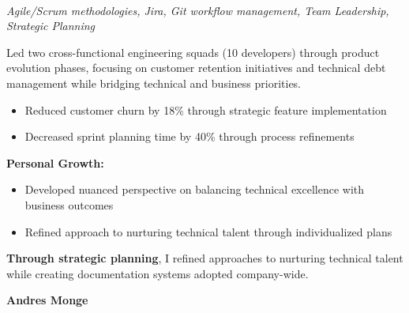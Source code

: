 \documentclass[a4paper,10pt]{article}
\newcommand{\experiencebreak}{\needspace{18\baselineskip}}
\begin{document}
\experiencebreak
\noindent\uline{} \\
\vspace{0.1cm} \hspace{0.2cm}
{\small\textit{Agile/Scrum methodologies, Jira, Git workflow management, Team Leadership, Strategic Planning}}

Led two cross-functional engineering squads (10 developers) through product evolution phases, focusing on customer retention initiatives and technical debt management while bridging technical and business priorities.

\vspace{0.2cm}
\begin{itemize}[label=\textcolor{darkblue}{\textbullet}, leftmargin=*, nosep]
	\item Reduced customer churn by 18\% through strategic feature implementation
	\item Decreased sprint planning time by 40\% through process refinements
\end{itemize}

\vspace{0.2cm}
\textbf{Personal Growth:}
\vspace{0.2cm}
\begin{itemize}[label=\textcolor{darkblue}{\textbullet}, leftmargin=*, nosep]
	\item Developed nuanced perspective on balancing technical excellence with business outcomes
	\item Refined approach to nurturing technical talent through individualized plans
\end{itemize}

\vspace{0.4cm}

\textbf{Through strategic planning}, I refined approaches to nurturing technical talent while creating documentation systems adopted company-wide.


\vspace{0.2cm} %

\vspace{0.5cm}
\noindent
{}\hfill
{\large\bfseries\color{blue}\selectfont
	A\color{lightblue}ndr\color{blue}e\color{lightblue}s \color{blue}Monge}
\vspace{0.3cm}
\end{document}
